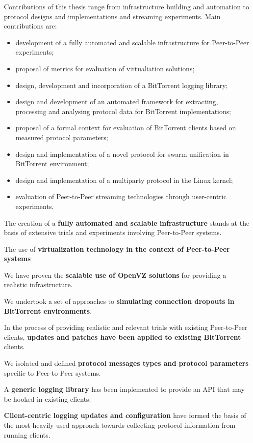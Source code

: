 Contributions of this thesis range from infrastructure building and automation
to protocol designs and implementations and streaming experiments. Main
contributions are:
\begin{itemize}
  \item development of a fully automated and scalable infrastructure for
  Peer-to-Peer experiments;
  \item proposal of metrics for evaluation of virtualiation solutions;
  \item design, development and incorporation of a BitTorrent logging library;
  \item design and development of an automated framework for extracting,
  processing and analysing protocol data for BitTorrent implementations;
  \item proposal of a formal context for evaluation of BitTorrent clients
  based on measured protocol parameters;
  \item design and implementation of a novel protocol for swarm unification in
  BitTorrent environment;
  \item design and implementation of a multiparty protocol in the Linux
  kernel;
  \item evaluation of Peer-to-Peer streaming technologies through user-centric
  experiments.
\end{itemize}

The creation of a \textbf{fully automated and scalable infrastructure} stands
at the basis of extensive trials and experiments involving Peer-to-Peer
systems.

The use of \textbf{virtualization technology in the context of Peer-to-Peer
systems}

We have proven the \textbf{scalable use of OpenVZ solutions} for providing a
realistic infrastructure.

We undertook a set of approaches to \textbf{simulating connection dropouts in
BitTorrent environments}.

In the process of providing realistic and relevant trials with existing
Peer-to-Peer clients, \textbf{updates and patches have been applied to
existing BitTorrent} clients.

We isolated and defined \textbf{protocol messages types and protocol
parameters} specific to Peer-to-Peer systems.

A \textbf{generic logging library} has been implemented to provide an API that
may be hooked in existing clients.

\textbf{Client-centric logging updates and configuration} have formed the
basis of the most heavily used approach towards collecting protocol
information from running clients.

